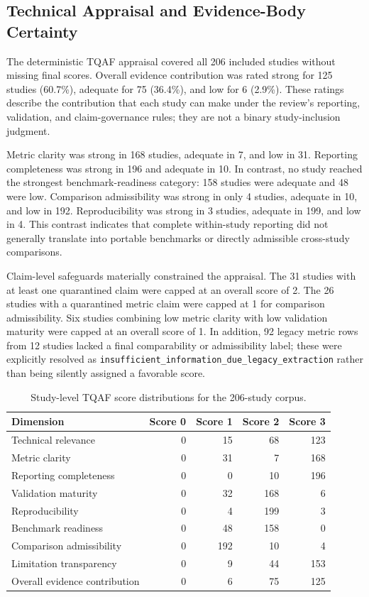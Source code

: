 \subsection{Technical Appraisal and Evidence-Body Certainty}
\label{subsec:tqaf_results}

The deterministic TQAF appraisal covered all 206 included studies without
missing final scores. Overall evidence contribution was rated strong for 125
studies (60.7\%), adequate for 75 (36.4\%), and low for 6 (2.9\%). These
ratings describe the contribution that each study can make under the review's
reporting, validation, and claim-governance rules; they are not a binary
study-inclusion judgment.

Metric clarity was strong in 168 studies, adequate in 7, and low in 31.
Reporting completeness was strong in 196 and adequate in 10. In contrast, no
study reached the strongest benchmark-readiness category: 158 studies were
adequate and 48 were low. Comparison admissibility was strong in only 4
studies, adequate in 10, and low in 192. Reproducibility was strong in 3
studies, adequate in 199, and low in 4. This contrast indicates that complete
within-study reporting did not generally translate into portable benchmarks
or directly admissible cross-study comparisons.

Claim-level safeguards materially constrained the appraisal. The 31 studies
with at least one quarantined claim were capped at an overall score of 2. The
26 studies with a quarantined metric claim were capped at 1 for comparison
admissibility. Six studies combining low metric clarity with low validation
maturity were capped at an overall score of 1. In addition, 92 legacy metric
rows from 12 studies lacked a final comparability or admissibility label; these
were explicitly resolved as
\texttt{insufficient\_information\_due\_legacy\_extraction} rather than being
silently assigned a favorable score.

\begin{table}[!t]
\caption{Study-level TQAF score distributions for the 206-study corpus.}
\label{tab:tqaf_distributions}
\centering
\begin{tabular}{lrrrr}
\toprule
\textbf{Dimension} & \textbf{Score 0} & \textbf{Score 1} & \textbf{Score 2} & \textbf{Score 3} \\
\midrule
Technical relevance & 0 & 15 & 68 & 123 \\
Metric clarity & 0 & 31 & 7 & 168 \\
Reporting completeness & 0 & 0 & 10 & 196 \\
Validation maturity & 0 & 32 & 168 & 6 \\
Reproducibility & 0 & 4 & 199 & 3 \\
Benchmark readiness & 0 & 48 & 158 & 0 \\
Comparison admissibility & 0 & 192 & 10 & 4 \\
Limitation transparency & 0 & 9 & 44 & 153 \\
Overall evidence contribution & 0 & 6 & 75 & 125 \\
\bottomrule
\end{tabular}
\end{table}

